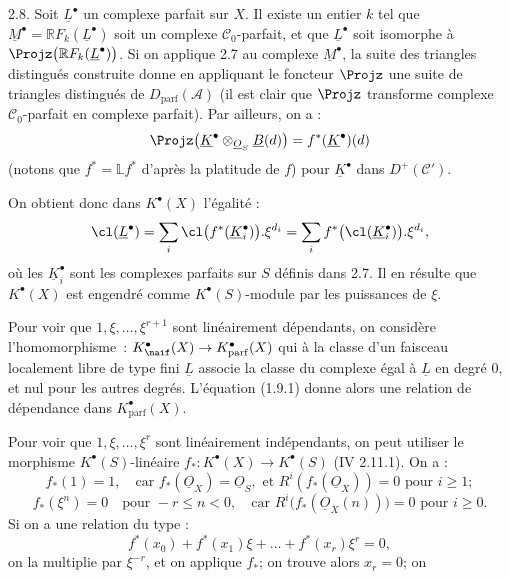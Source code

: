 
2.8.
Soit $\underline{L}^{\bullet}$ un complexe parfait sur $X$. Il existe un entier $k$ tel que $\underline{M}^{\bullet}=\mathbb R F_k(\underline{L}^{\bullet})$ soit un complexe $\mathcal C_0$-parfait, et que $\underline{L}^{\bullet}$ soit isomorphe à $\Projz\bigl(\mathbb R F_k(\underline{L}^{\bullet})\bigr)$. Si on applique 2.7 au complexe $\underline{M}^{\bullet}$, la suite des triangles distingués construite donne en appliquant le foncteur $\Projz$ une suite de triangles distingués de $D_{\mathrm{parf}}(\mathcal A)$ (il est clair que $\Projz$ transforme complexe $\mathcal C_0$-parfait en complexe parfait). Par ailleurs, on a :
\[
  \Projz\bigl(\underline{K}^{\bullet}\otimes_{\underline{O}_S}\underline{B}(d)\bigr)
  = f^*(\underline{K}^{\bullet})(d)
\]
(notons que $f^*=\mathbb L f^*$ d'après la platitude de $f$) pour $\underline{K}^{\bullet}$ dans $D^+(\mathcal C')$.

On obtient donc dans $K^{\bullet}(X)$ l'égalité :
\[
  \cl(\underline{L}^{\bullet})
  =\sum_i\cl\bigl(f^*(\underline{K}_i^{\bullet})\bigr).\xi^{d_i}
  =\sum_i f^*\bigl(\cl(\underline{K}_i^{\bullet})\bigr).\xi^{d_i},
\]
où les $\underline{K}_i^{\bullet}$ sont les complexes parfaits sur $S$ définis dans 2.7. Il en résulte que $K^{\bullet}(X)$ est engendré comme $K^{\bullet}(S)$-module par les puissances de $\xi$.

Pour voir que $1,\xi,\ldots,\xi^{r+1}$ sont linéairement dépendants, on considère l'homomorphisme~: $K^{\bullet}_{\naif}(X)\to K^{\bullet}_{\mathrm{parf}}(X)$ qui à la classe d'un faisceau localement libre de type fini $\underline{L}$ associe la classe du complexe égal à $\underline{L}$ en degré $0$, et nul pour les autres degrés. L'équation (1.9.1) donne alors une relation de dépendance dans $K^{\bullet}_{\mathrm{parf}}(X)$.

Pour voir que $1,\xi,\ldots,\xi^r$ sont linéairement indépendants, on peut utiliser le morphisme $K^{\bullet}(S)$-linéaire $f_*:K^{\bullet}(X)\to K^{\bullet}(S)$ (IV 2.11.1). On a :
\[
  f_*(1)=1,
  \quad\text{car } f_*(\underline{O}_X)=\underline{O}_S,\text{ et }R^i(f_*(\underline{O}_X))=0\text{ pour }i\geq1;
\]
\[
  f_*(\xi^n)=0\quad\text{pour }-r\leq n<0,
  \quad\text{car }R^i\bigl(f_*(\underline{O}_X(n))\bigr)=0\text{ pour }i\geq0.
\]
Si on a une relation du type :
\[
  f^*(x_0)+f^*(x_1)\xi+\ldots+f^*(x_r)\xi^r=0,
\]
on la multiplie par $\xi^{-r}$, et on applique $f_*$; on trouve alors $x_r=0$; on 
